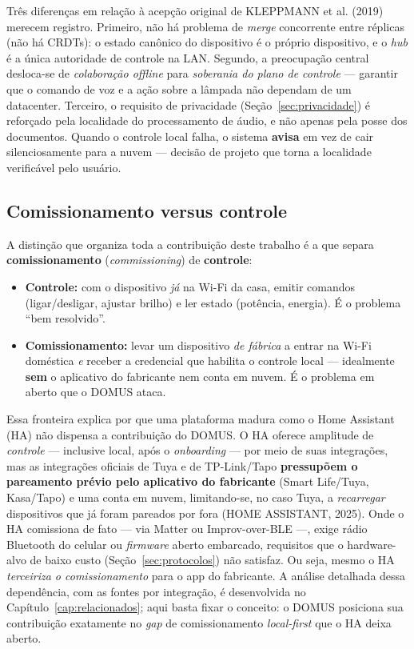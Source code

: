 Três diferenças em relação à acepção original de KLEPPMANN et al. (2019) merecem
registro. Primeiro, não há problema de \textit{merge} concorrente entre réplicas
(não há CRDTs): o estado canônico do dispositivo é o próprio dispositivo, e o
\textit{hub} é a única autoridade de controle na LAN. Segundo, a preocupação
central desloca-se de \textit{colaboração offline} para \textit{soberania do plano
de controle} --- garantir que o comando de voz e a ação sobre a lâmpada não
dependam de um datacenter. Terceiro, o requisito de privacidade (Seção~\ref{sec:privacidade})
é reforçado pela localidade do processamento de áudio, e não apenas pela posse dos
documentos. Quando o controle local falha, o sistema \textbf{avisa} em vez de cair
silenciosamente para a nuvem --- decisão de projeto que torna a localidade
verificável pelo usuário.

\subsection{Comissionamento versus controle}\label{sec:comissionamento-controle}

A distinção que organiza toda a contribuição deste trabalho é a que separa
\textbf{comissionamento} (\textit{commissioning}) de \textbf{controle}:

\begin{itemize}
  \item \textbf{Controle:} com o dispositivo \textit{já} na Wi-Fi da casa,
        emitir comandos (ligar/desligar, ajustar brilho) e ler estado
        (potência, energia). É o problema ``bem resolvido''.
  \item \textbf{Comissionamento:} levar um dispositivo \textit{de fábrica} a
        entrar na Wi-Fi doméstica \textit{e} receber a credencial que habilita o
        controle local --- idealmente \textbf{sem} o aplicativo do fabricante nem
        conta em nuvem. É o problema em aberto que o DOMUS ataca.
\end{itemize}

Essa fronteira explica por que uma plataforma madura como o Home Assistant (HA)
não dispensa a contribuição do DOMUS. O HA oferece amplitude de \textit{controle}
--- inclusive local, após o \textit{onboarding} --- por meio de suas integrações,
mas as integrações oficiais de Tuya e de TP-Link/Tapo \textbf{pressupõem o
pareamento prévio pelo aplicativo do fabricante} (Smart Life/Tuya, Kasa/Tapo) e uma
conta em nuvem, limitando-se, no caso Tuya, a \textit{recarregar} dispositivos que
já foram pareados por fora (HOME ASSISTANT, 2025). Onde o HA comissiona de fato ---
via Matter ou Improv-over-BLE ---, exige rádio Bluetooth do celular ou
\textit{firmware} aberto embarcado, requisitos que o hardware-alvo de baixo custo
(Seção~\ref{sec:protocolos}) não satisfaz. Ou seja, mesmo o HA \textit{terceiriza o
comissionamento} para o app do fabricante. A análise detalhada dessa dependência,
com as fontes por integração, é desenvolvida no
Capítulo~\ref{cap:relacionados}; aqui basta fixar o conceito: o DOMUS
posiciona sua contribuição exatamente no \textit{gap} de comissionamento
\textit{local-first} que o HA deixa aberto.

